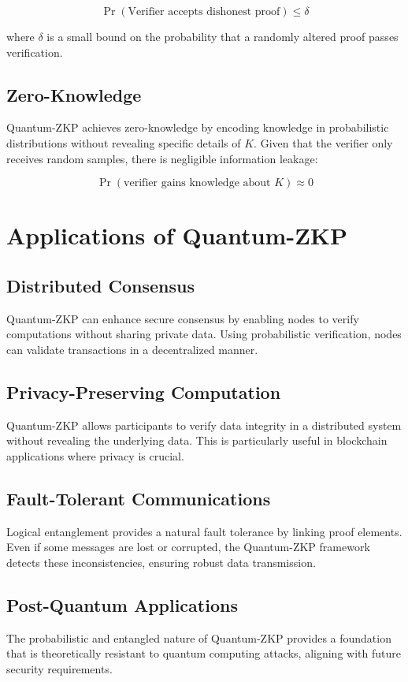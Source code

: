 \documentclass{article.cls}
\begin{document}
\begin{equation}
\Pr(\text{Verifier accepts dishonest proof}) \leq \delta
\end{equation}

where $\delta$ is a small bound on the probability that a randomly altered proof passes verification.

\subsection{Zero-Knowledge}
Quantum-ZKP achieves zero-knowledge by encoding knowledge in probabilistic distributions without revealing specific details of $K$. Given that the verifier only receives random samples, there is negligible information leakage:

\begin{equation}
\Pr(\text{verifier gains knowledge about } K) \approx 0
\end{equation}

\section{Applications of Quantum-ZKP}
\subsection{Distributed Consensus}
Quantum-ZKP can enhance secure consensus by enabling nodes to verify computations without sharing private data. Using probabilistic verification, nodes can validate transactions in a decentralized manner.

\subsection{Privacy-Preserving Computation}
Quantum-ZKP allows participants to verify data integrity in a distributed system without revealing the underlying data. This is particularly useful in blockchain applications where privacy is crucial.

\subsection{Fault-Tolerant Communications}
Logical entanglement provides a natural fault tolerance by linking proof elements. Even if some messages are lost or corrupted, the Quantum-ZKP framework detects these inconsistencies, ensuring robust data transmission.

\subsection{Post-Quantum Applications}
The probabilistic and entangled nature of Quantum-ZKP provides a foundation that is theoretically resistant to quantum computing attacks, aligning with future security requirements.
\end{document}
